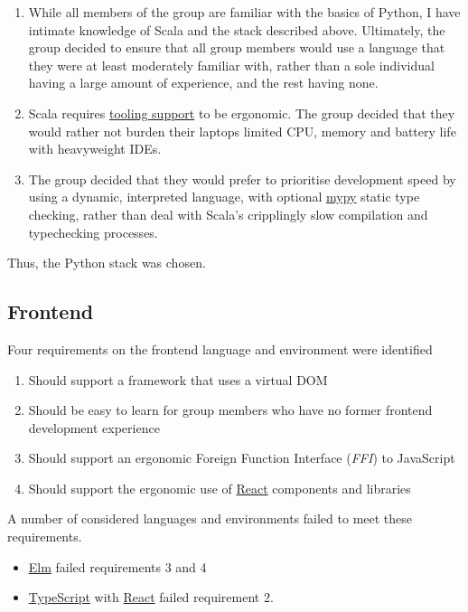 \documentclass[11pt,a4paper]{report}
\begin{document}
\begin{enumerate}
    \item While all members of the group are familiar with the basics of Python, I have intimate knowledge of Scala and the stack described above. Ultimately, the group decided to ensure that all group members would use a language that they were at least moderately familiar with, rather than a sole individual having a large amount of experience, and the rest having none.
    \item Scala requires \href{https://plugins.jetbrains.com/plugin/1347-scala}{tooling support} to be ergonomic. The group decided that they would rather not burden their laptops limited CPU, memory and battery life with heavyweight IDEs.
    \item The group decided that they would prefer to prioritise development speed by using a dynamic, interpreted language, with optional \href{http://mypy-lang.org/}{mypy} static type checking, rather than deal with Scala's cripplingly slow compilation and typechecking processes.
\end{enumerate}

Thus, the Python stack was chosen.

\subsection{Frontend}


Four requirements on the frontend language and environment were identified

\begin{enumerate}
    \item Should support a framework that uses a virtual DOM
    \item Should be easy to learn for group members who have no former frontend development experience
    \item Should support an ergonomic Foreign Function Interface (\textit{FFI}) to JavaScript
    \item Should support the ergonomic use of \href{https://facebook.github.io/react/}{React} components and libraries
\end{enumerate}


A number of considered languages and environments failed to meet these requirements.


\begin{itemize}
    \item \href{http://elm-lang.org/}{Elm} failed requirements 3 and 4
    \item \href{https://www.typescriptlang.org/}{TypeScript} with \href{https://facebook.github.io/react/}{React} failed requirement 2.
\end{itemize}
\end{document}
